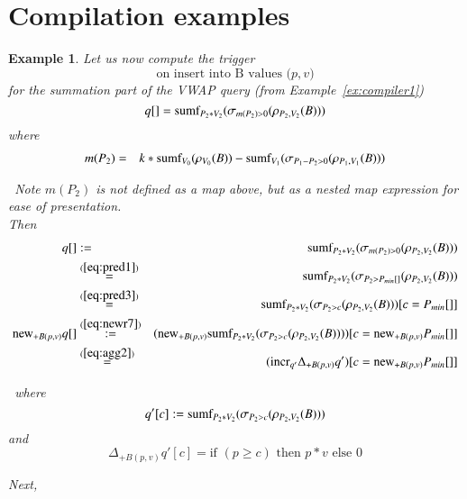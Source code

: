 \documentclass{article}
\newtheorem{example}[theorem]{Example}
\begin{document}
\section{Compilation examples}
\begin{example}\em
Let us now compute the trigger
\[
\mbox{on insert into B values ($p, v$)}
\]
for the summation part of the VWAP query (from Example~\ref{ex:compiler1})
\[
q[] = \mbox{sumf}_{P_2 * V_2}(\sigma_{m(P_2) > 0} (\rho_{P_2, V_2}(B)))
\]
where
\begin{eqnarray*}
m(P_2) &=&
k*\mbox{sumf}_{V_0}(\rho_{V_0}(B)) -
\mbox{sumf}_{V_1}(\sigma_{P_1 - P_2 > 0}(\rho_{P_1,V_1}(B)))
\\
\end{eqnarray*}

\noindent~Note $m(P_2)$ is not defined as a map above, but as a nested map
expression for ease of presentation.\\

Then
\begin{eqnarray*}
q[] &:=&
\mbox{sumf}_{P_2 * V_2}(\sigma_{m(P_2) > 0} (\rho_{P_2, V_2}(B)))
\\
&\stackrel{(\ref{eq:pred1})}{=}&
\mbox{sumf}_{P_2 * V_2}(\sigma_{P_2 > P_{min}[]} (\rho_{P_2, V_2}(B)))
\\
&\stackrel{(\ref{eq:pred3})}{=}&
\mbox{sumf}_{P_2 * V_2}(\sigma_{P_2 > c} (\rho_{P_2, V_2}(B)))[c=P_{min}[]]
\\
\mathrm{new}_{+B(p,v)} q[]
&\stackrel{(\ref{eq:newr7})}{:=}&
(\mathrm{new}_{+B(p,v)}
\mbox{sumf}_{P_2 * V_2}(\sigma_{P_2 > c} (\rho_{P_2, V_2}(B))))
[c=\mathrm{new}_{+B(p,v)} P_{min}[]]
\\
&\stackrel{(\ref{eq:agg2})}{=}&
(\mathrm{incr}_{q'} \Delta_{+B(p,v)} q')
[c=\mathrm{new}_{+B(p,v)} P_{min}[]]
\end{eqnarray*}

\noindent~where
\[q'[c]:=\mbox{sumf}_{P_2 * V_2}(\sigma_{P_2 > c} (\rho_{P_2, V_2}(B)))\]
and
\[
\Delta_{+B(p,v)} q'[c] =
   \mbox{if $(p \ge c)$ then $p * v$ else $0$}
\]

Next,


\end{example}
\end{document}
